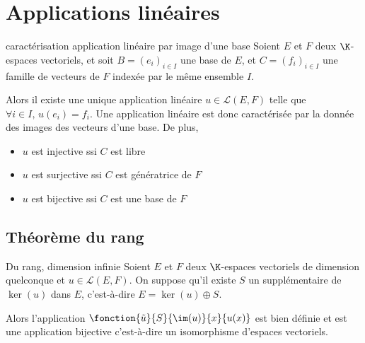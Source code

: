\section{Applications linéaires}
\begin{theorement}{caractérisation application linéaire par image d'une base}{}
    Soient $E$ et $F$ deux $\K$-espaces vectoriels, et soit $B = (e_i)_{i \in I}$ une base
    de $E$, et $C = (f_i)_{i \in I}$ une famille de vecteurs de $F$ indexée par le même ensemble $I$.

    Alors il existe une unique application linéaire $u \in \mathscr L(E, F)$ telle que
    $\forall i \in I, \, u(e_i) = f_i$. Une application linéaire est donc caractérisée par la 
    donnée des images des vecteurs d'une base. 
    De plus, 

    \svspace \begin{itemize}
        \item $u$ est injective ssi $C$ est libre
        \item $u$ est surjective ssi $C$ est génératrice de $F$
        \item $u$ est bijective ssi $C$ est une base de $F$
    \end{itemize}
\end{theorement}

\subsection{Théorème du rang }

\begin{theoreme}{Du rang, dimension infinie}{}
    Soient $E$ et $F$ deux $\K$-espaces vectoriels de dimension quelconque et $u \in \mathscr L(E, F)$.
    On suppose qu'il existe $S$ un supplémentaire de $\ker(u)$ dans $E$, c'est-à-dire
    $E = \ker(u) \oplus S$.

    Alors l'application $\fonction{\tilde u}{S}{\im(u)}{x}{u(x)}$ est bien définie et est une 
    application bijective c'est-à-dire un isomorphisme d'espaces vectoriels.
\end{theoreme}

